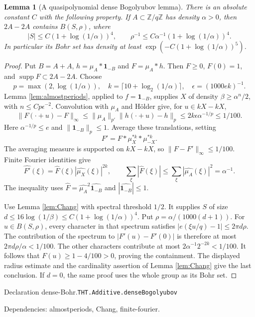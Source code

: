 \documentclass[11pt]{article}
\newtheorem{lemma}[theorem]{Lemma}
\theoremstyle{definition}
\newcommand{\Z}{\mathbb Z}
\newcommand{\one}{\mathbf 1}
\newcommand{\supp}{\operatorname{supp}}
\numberwithin{equation}{section}
\newcommand{\bp}[3]{\par\smallskip\begingroup\footnotesize
\noindent\hypertarget{bp:#1}{\textsf{Declaration #1.}}\quad\nolinkurl{#2}\par
\noindent\textsf{Dependencies:} #3.\par\endgroup\smallskip}
\begin{document}
\begin{lemma}[A quasipolynomial dense Bogolyubov lemma]\label{lem:dense-Bohr}
There is an absolute constant $C$ with the following property. If $A\subset\Z/q\Z$ has density $\alpha>0$, then $2A-2A$ contains $B(S,\rho)$, where
\[
 |S|\le C(1+\log(1/\alpha))^4,
 \qquad \rho^{-1}\le C\alpha^{-1}(1+\log(1/\alpha))^4.
\]
In particular its Bohr set has density at least $\exp(-C(1+\log(1/\alpha))^5)$.
\end{lemma}
\begin{proof}
Put $B=A+A$, $h=\mu_A*\one_{-B}$ and $F=\mu_A*h$. Then $F\ge0$, $F(0)=1$, and $\supp F\subset2A-2A$. Choose
\[
 p=\max(2,\log(1/\alpha)),\quad
 k=\lceil 10+\log_2(1/\alpha)\rceil,\quad \epsilon=(1000 e k)^{-1}.
\]
Lemma \ref{lem:almostperiods}, applied to $f=\one_{-B}$, supplies $X$ of density $\beta\ge\alpha^n/2$, with $n\le Cp\epsilon^{-2}$. Convolution with $\mu_A$ and H\"older give, for $u\in kX-kX$,
\[
 \|F(\cdot+u)-F\|_\infty
 \le\|\mu_A\|_{p'}\|h(\cdot+u)-h\|_p
 \le2k\epsilon\alpha^{-1/p}\le1/100.
\]
Here $\alpha^{-1/p}\le e$ and $\|\one_{-B}\|_p\le1$. Average these translations, setting
\[
 F'=F*\mu_X^{*k}*\mu_{-X}^{*k}.
\]
The averaging measure is supported on $kX-kX$, so $\|F-F'\|_\infty\le1/100$. Finite Fourier identities give
\[
 \widehat{F'}(\xi)=\widehat F(\xi)|\widehat{\mu_X}(\xi)|^{2k},
 \qquad \sum_\xi|\widehat F(\xi)|
 \le\sum_\xi|\widehat{\mu_A}(\xi)|^2=\alpha^{-1}.
\]
The inequality uses $\widehat F=\widehat{\mu_A}^2\widehat{\one_{-B}}$ and $|\widehat{\one_{-B}}|\le1$.

Use Lemma \ref{lem:Chang} with spectral threshold $1/2$. It supplies $S$ of size $d\le16\log(1/\beta)\le C(1+\log(1/\alpha))^4$. Put $\rho=\alpha/(1000(d+1))$. For $u\in B(S,\rho)$, every character in that spectrum satisfies $|e(\xi u/q)-1|\le2\pi d\rho$. The contribution of the spectrum to $|F'(u)-F'(0)|$ is therefore at most $2\pi d\rho/\alpha<1/100$. The other characters contribute at most $2\alpha^{-1}2^{-2k}<1/100$. It follows that $F(u)\ge1-4/100>0$, proving the containment. The displayed radius estimate and the cardinality assertion of Lemma \ref{lem:Chang} give the last conclusion. If $d=0$, the same proof uses the whole group as its Bohr set.
\end{proof}
\bp{dense-Bohr}{THT.Additive.denseBogolyubov}{almostperiods, Chang, finite-fourier}
\end{document}
